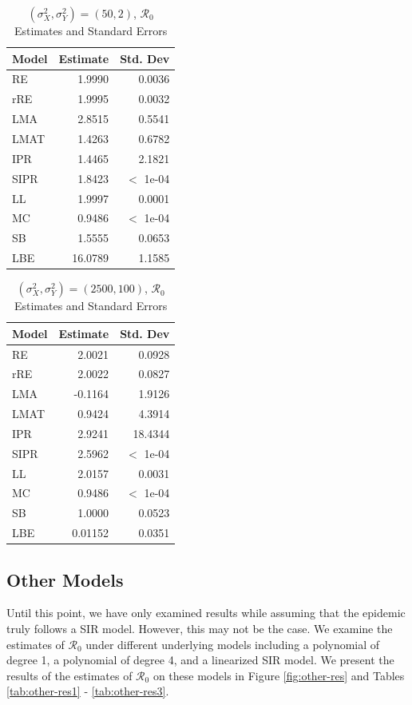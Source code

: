 \documentclass[12pt]{article}
\newcommand{\rr}{\ensuremath{\mathcal{R}_0}}
\begin{document}
\begin{table}[H]
	
	
	\centering
	\begin{tabular}[t]{l|r|r}
		\hline
		Model & Estimate & Std. Dev\\
		\hline
		RE & 1.9990 & 0.0036\\
		\hline
		rRE & 1.9995 & 0.0032\\
		\hline
		LMA & 2.8515 & 0.5541\\
		\hline
		LMAT & 1.4263 & 0.6782\\
		\hline
		IPR & 1.4465 & 2.1821\\
		\hline
		SIPR & 1.8423 & $<$ 1e-04\\
		\hline
		LL & 1.9997 & 0.0001\\
		\hline
		MC & 0.9486 & $<$ 1e-04\\
		\hline
		SB & 1.5555 & 0.0653\\
		\hline
		LBE & 16.0789 & 1.1585\\
		\hline
	\end{tabular}
	\caption{ $(\sigma^2_X, \sigma^2_Y) = (50, 2)$, $\rr$ Estimates and Standard Errors}
\end{table}

\begin{table}[H]
	
	
	\centering
	\begin{tabular}[t]{l|r|r}
		\hline
		Model & Estimate & Std. Dev\\
		\hline
		RE & 2.0021 & 0.0928\\
		\hline
		rRE & 2.0022 & 0.0827\\
		\hline
		LMA & -0.1164 & 1.9126\\
		\hline
		LMAT & 0.9424 & 4.3914\\
		\hline
		IPR & 2.9241 & 18.4344\\
		\hline
		SIPR & 2.5962 & $<$ 1e-04\\
		\hline
		LL & 2.0157 & 0.0031\\
		\hline
		MC & 0.9486 & $<$ 1e-04\\
		\hline
		SB & 1.0000 & 0.0523\\
		\hline
		LBE & 0.01152 & 0.0351\\
		\hline
	\end{tabular}
	\caption{$(\sigma^2_X, \sigma^2_Y) = (2500, 100)$, $\rr$ Estimates and Standard Errors}
\end{table}

\subsection{Other Models}\label{sec:res-oth}
Until this point, we have only examined results while assuming that the epidemic truly follows a SIR model.  However, this may not be the case.  We examine the estimates of $\rr$ under different underlying models including a polynomial of degree 1, a polynomial of degree 4, and a linearized SIR model.  We present the results of the estimates of $\rr$ on these models in Figure \ref{fig:other-res} and Tables \ref{tab:other-res1} - \ref{tab:other-res3}.
\end{document}
